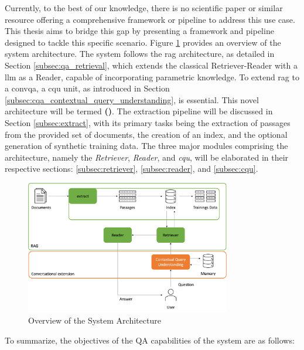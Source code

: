 Currently, to the best of our knowledge, there is no scientific paper or similar resource offering a comprehensive framework or pipeline to address this use case. This thesis aims to bridge this gap by presenting a framework and pipeline designed to tackle this specific scenario. Figure \ref{fig:overview-system-architecture} provides an overview of the system architecture. The system follows the \gls{rag} architecture, as detailed in Section \ref{subsec:qa_retrieval}, which extends the classical Retriever-Reader with a \gls{llm} as a Reader, capable of incorporating parametric knowledge. To extend \gls{rag} to a \gls{convqa}, a \gls{cqu} unit, as introduced in Section \ref{subsec:cqa_contextual_query_understanding}, is essential. This novel architecture will be termed \textbf{ ()}. The extraction pipeline will be discussed in Section \ref{subsec:extract}, with its primary tasks being the extraction of passages from the provided set of documents, the creation of an index, and the optional generation of synthetic training data. The three major modules comprising the architecture, namely the \textit{Retriever}, \textit{Reader}, and \textit{\gls{cqu}}, will be elaborated in their respective sections: \ref{subsec:retriever}, \ref{subsec:reader}, and \ref{subsec:cqu}.

\begin{figure}
    \centering
    \includegraphics[width=0.8\textwidth]{Grafiken/System_Architecture.png}
    \caption{Overview of the System Architecture}
    \label{fig:overview-system-architecture}
\end{figure}

To summarize, the objectives of the QA capabilities of the system are as follows:

